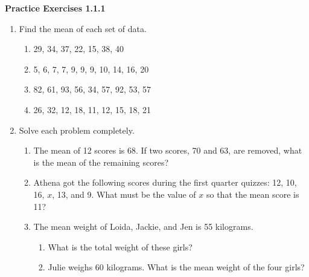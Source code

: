 \vspace{1ex}
\noindent\textbf{Practice Exercises 1.1.1}

\vspace{0.75ex}

\begin{enumerate}[label = \Alph*. ]
\item Find the mean of each set of data.
\begin{enumerate}[label = \arabic*. ]
\item 29, 34, 37, 22, 15, 38, 40
\item 5, 6, 7, 7, 9, 9, 9, 10, 14, 16, 20
\item 82, 61, 93, 56, 34, 57, 92, 53, 57
\item 26, 32, 12, 18, 11, 12, 15, 18, 21

\end{enumerate}  

\item Solve each problem completely. 
\begin{enumerate}[label = \arabic*. ]
\item The mean of 12 scores is 68. If two scores, 70 and 63, are removed, what is the mean of the remaining scores?
\item Athena got the following scores during the first quarter quizzes: 12, 10, 16, $x$, 13, and 9. What must be the value of $x$ so that the mean score is 11?
\item The mean weight of Loida, Jackie, and Jen is 55 kilograms.
\begin{enumerate}[label = \alph*. ]
\item What is the total weight of these girls?
\item Julie weighs 60 kilograms. What is the mean weight of the four girls?

\end{enumerate}  
\end{enumerate}   

\end{enumerate} 